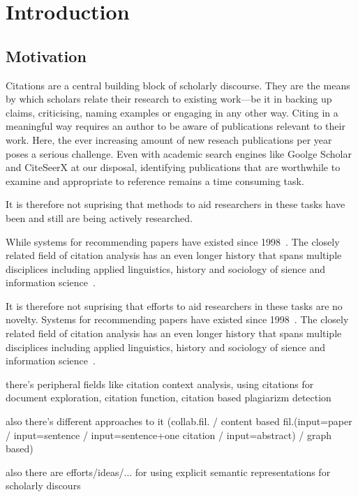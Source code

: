 \chapter{Introduction}\label{chap:introduction}
\section{Motivation}
Citations are a central building block of scholarly discourse. They are the means by which scholars relate their research to existing work---be it in backing up claims, criticising, naming examples or engaging in any other way. Citing in a meaningful way requires an author to be aware of publications relevant to their work.
Here, the ever increasing amount of new reseach publications per year poses a serious challenge. Even with academic search engines like Goolge Scholar and CiteSeerX at our disposal, identifying publications that are worthwhile to examine and appropriate to reference remains a time consuming task.

It is therefore not suprising that methods to aid researchers in these tasks have been and still are being actively researched. 

While systems for recommending papers have existed since 1998~\cite{Bollacker1998,Beel2016}. The closely related field of citation analysis has an even longer history that spans multiple disciplices including applied linguistics, history and sociology of sience and information science~\cite{Swales1986,White2004}.

It is therefore not suprising that efforts to aid researchers in these tasks are no novelty. Systems for recommending papers have existed since 1998~\cite{Bollacker1998,Beel2016}. The closely related field of citation analysis has an even longer history that spans multiple disciplices including applied linguistics, history and sociology of sience and information science~\cite{Swales1986,White2004}.

there's peripheral fields like citation context analysis\cite{HERNANDEZ-ALVAREZ2016}, using citations for document exploration\cite{Berger2016}, citation function\cite{Moravcsik1975,Abujbara2013,Teufel2006a,Teufel2006b}, citation based plagiarizm detection\cite{Gipp2010}

also there’s different approaches to it (collab.fil. / content based fil.(input=paper / input=sentence / input=sentence+one citation\cite{Kobayashi2018} / input=abstract\cite{Ayala-Gomez2018}) / graph based)

also there are efforts/ideas/... for using explicit semantic representations for scholarly discours\cite{BuckinghamShum2000,Schneider2013,Kitamoto2015}

